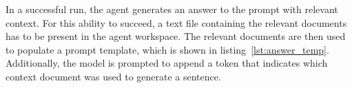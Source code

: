\documentclass[../main.tex]{subfiles}
\begin{document}


In a successful run, the agent generates an answer to the prompt with
relevant context.
For this ability to succeed, a text file containing the relevant documents
has to be present in the agent workspace.
The relevant documents are then used to populate a prompt template, which
is shown in listing~\ref{lst:answer_temp}.
Additionally, the model is prompted to append a token that indicates which context
document was used to generate a sentence.
\end{document}

